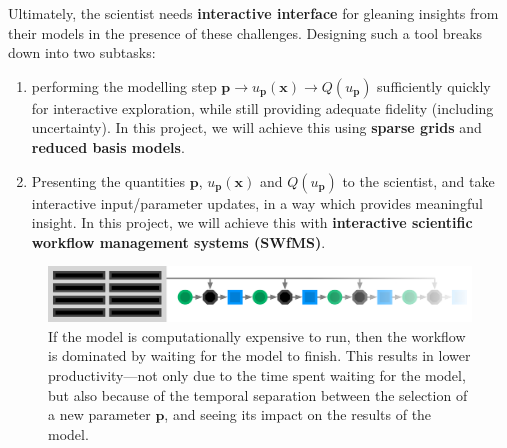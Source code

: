 \documentclass[a4paper,fontsize=12pt]{scrartcl}
\begin{document}
Ultimately, the scientist needs \textbf{interactive interface} for
gleaning insights from their models in the presence of these
challenges. Designing such a tool breaks down into two subtasks:
\begin{enumerate}
\item performing the modelling step
  $\mathbf{p} \rightarrow u_{\mathbf{p}}(\mathbf{x}) \rightarrow
  Q(u_{\mathbf{p}})$ sufficiently quickly for interactive exploration,
  while still providing adequate fidelity (including uncertainty). In this project, we will
  achieve this using \textbf{sparse grids} and \textbf{reduced basis
    models}. %
\item Presenting the quantities $\mathbf{p}$,
  $u_{\mathbf{p}}(\mathbf{x})$ and $Q(u_{\mathbf{p}})$ to the
  scientist, and take interactive input/parameter updates, in a way
  which provides meaningful insight. In this project, we will achieve
  this with \textbf{interactive scientific workflow management systems
    (SWfMS)}.
\end{enumerate}
\begin{figure}
  \centering
  \includegraphics[width=\textwidth]{figures/sg-surrogate-model-fb-loop.pdf}
  \caption{If the model is computationally expensive to run, then the
    workflow is dominated by waiting for the model to finish. This
    results in lower productivity---not only due to the time spent
    waiting for the model, but also because of the temporal separation
  between the selection of a new parameter $\mathbf{p}$, and seeing
  its impact on the results of the model.}
  \label{fig:sg-surrogate-model-fb-loop.pdf}
\end{figure}
\end{document}
